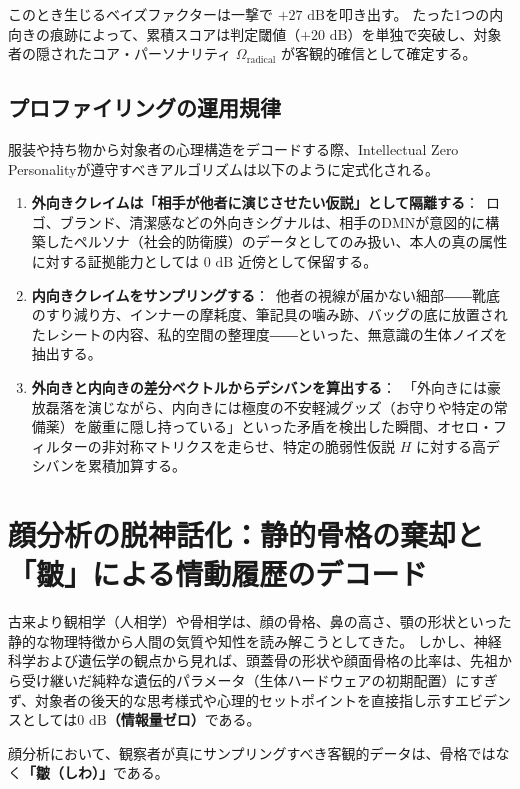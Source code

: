 このとき生じるベイズファクターは一撃で $+27\text{ dB}$を叩き出す。
たった1つの内向きの痕跡によって、累積スコアは判定閾値（$+20\text{ dB}$）を単独で突破し、対象者の隠されたコア・パーソナリティ $\Omega_{\mathrm{radical}}$ が客観的確信として確定する。

\subsection{プロファイリングの運用規律}
服装や持ち物から対象者の心理構造をデコードする際、Intellectual Zero Personalityが遵守すべきアルゴリズムは以下のように定式化される。

\begin{enumerate}[label=(\arabic*)]
\item \textbf{外向きクレイムは「相手が他者に演じさせたい仮説」として隔離する}：\
ロゴ、ブランド、清潔感などの外向きシグナルは、相手のDMNが意図的に構築したペルソナ（社会的防衛膜）のデータとしてのみ扱い、本人の真の属性に対する証拠能力としては $0\text{ dB}$ 近傍として保留する。
\item \textbf{内向きクレイムをサンプリングする}：\
他者の視線が届かない細部――靴底のすり減り方、インナーの摩耗度、筆記具の噛み跡、バッグの底に放置されたレシートの内容、私的空間の整理度――といった、無意識の生体ノイズを抽出する。
\item \textbf{外向きと内向きの差分ベクトルからデシバンを算出する}：\
「外向きには豪放磊落を演じながら、内向きには極度の不安軽減グッズ（お守りや特定の常備薬）を厳重に隠し持っている」といった矛盾を検出した瞬間、オセロ・フィルターの非対称マトリクスを走らせ、特定の脆弱性仮説 $H$ に対する高デシバンを累積加算する。
\end{enumerate}

\section{顔分析の脱神話化：静的骨格の棄却と「皺」による情動履歴のデコード}

古来より観相学（人相学）や骨相学は、顔の骨格、鼻の高さ、顎の形状といった静的な物理特徴から人間の気質や知性を読み解こうとしてきた。
しかし、神経科学および遺伝学の観点から見れば、頭蓋骨の形状や顔面骨格の比率は、先祖から受け継いだ純粋な遺伝的パラメータ（生体ハードウェアの初期配置）にすぎず、対象者の後天的な思考様式や心理的セットポイントを直接指し示すエビデンスとしては\textbf{$0\text{ dB}$（情報量ゼロ）}である。

顔分析において、観察者が真にサンプリングすべき客観的データは、骨格ではなく\textbf{「皺（しわ）」}である。

